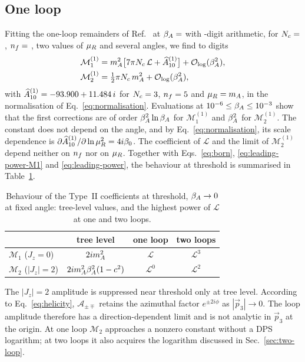 \subsection{One loop}
\label{sec:one-loop}

Fitting the one-loop remainders of Ref.~\cite{Bhattacharya:2019bmd} at $\beta_A=$ \OneLoopFitBetas{} with \OneLoopDigits-digit arithmetic, for $N_c=$ \OneLoopScanNc, $n_f=$ \OneLoopScanNf{}, two values of $\mu_R$ and several angles, we find to \OneLoopAgreementDigits{} digits
\begin{align}
 \mathcal M_1^{(1)}&=m_A^2\bigl[7\pi N_c\,\mathcal L+\widehat A^{(1)}_{10}\bigr]+\mathcal{O}_{\log}(\beta_A^2),
 \nonumber\\
 \mathcal M_2^{(1)}&=\tfrac{1}{2}\pi N_c\,m_A^2+\mathcal{O}_{\log}(\beta_A^2),
 \label{eq:one-loop-threshold}
\end{align}
with $\widehat A^{(1)}_{10}=-93.900+11.484\,i$ for $N_c=3$, $n_f=5$ and $\mu_R=m_A$, in the normalisation of Eq.~\eqref{eq:normalisation}. Evaluations at $10^{-6}\leq\beta_A\leq10^{-3}$ show that the first corrections are of order $\beta_A^2\ln\beta_A$ for $\mathcal M_1^{(1)}$ and $\beta_A^2$ for $\mathcal M_2^{(1)}$. The constant does not depend on the angle, and by Eq.~\eqref{eq:normalisation}, its scale dependence is $\partial\widehat A^{(1)}_{10}/\partial\ln\mu_R^2=4i\beta_0$. The coefficient of $\mathcal L$ and the limit of $\mathcal M_2^{(1)}$ depend neither on $n_f$ nor on $\mu_R$. Together with Eqs.~\eqref{eq:born}, \eqref{eq:leading-power-M1} and \eqref{eq:leading-power}, the behaviour at threshold is summarised in Table~\ref{tab:orders}.
\begin{table}[!htb]
\centering
 \begin{tabular}{lccc}
\toprule
  & tree level & one loop & two loops \\
  \midrule
  $\mathcal M_1$ ($J_z=0$) & $2im_A^2$ & $\mathcal L$ & $\mathcal L^3$\\
  $\mathcal M_2$ ($|J_z|=2$) & $2im_A^2\beta_A^2(1-c^2)$ & $\mathcal L^0$ & $\mathcal L^2$ \\
\bottomrule
\end{tabular}
\caption{Behaviour of the Type~II coefficients at threshold, $\beta_A\to0$ at fixed angle: tree-level values, and the highest power of $\mathcal L$ at one and two loops.}
\label{tab:orders}
\end{table}
The $|J_z|=2$ amplitude is suppressed near threshold only at tree level. According to Eq.~\eqref{eq:helicity}, $\mathcal A_{\pm\mp}$ retains the azimuthal factor $e^{\pm2i\phi}$ as $|\vec p_3|\to0$. The loop amplitude therefore has a direction-dependent limit and is not analytic in $\vec p_3$ at the origin. At one loop $\mathcal M_2$ approaches a nonzero constant without a DPS logarithm; at two loops it also acquires the logarithm discussed in Sec.~\ref{sec:two-loop}.

